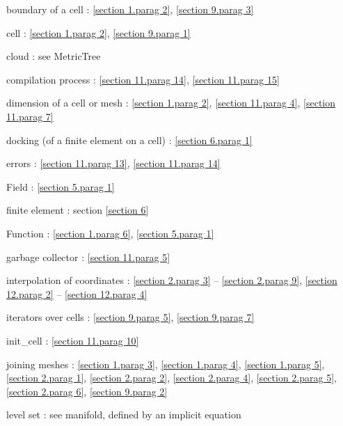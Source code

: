 \documentclass[a4paper]{scrreprt}
\def\numb{}
\newcommand\verm[1]{\textcolor{manif}{#1}}
\renewcommand\tt{\normalfont\ttfamily}
\begin{document}


\noindent
boundary of a cell : \ref{\numb section 1.\numb parag 2}, \ref{\numb section 9.\numb parag 3}

\noindent
cell : \ref{\numb section 1.\numb parag 2}, \ref{\numb section 9.\numb parag 1}

\noindent
cloud : see {\small\tt \verm{MetricTree}}

\noindent
compilation process : \ref{\numb section 11.\numb parag 14},
\ref{\numb section 11.\numb parag 15}

\noindent
dimension of a cell or mesh : \ref{\numb section 1.\numb parag 2},
\ref{\numb section 11.\numb parag 4}, \ref{\numb section 11.\numb parag 7}

\noindent
docking (of a finite element on a cell) : \ref{\numb section 6.\numb parag 1}

\noindent
errors : \ref{\numb section 11.\numb parag 13}, \ref{\numb section 11.\numb parag 14}

\noindent
{\small\tt \verm{Field}} : \ref{\numb section 5.\numb parag 1}

\noindent
finite element : section \ref{\numb section 6}

\noindent
{\small\tt \verm{Function}} : \ref{\numb section 1.\numb parag 6},
\ref{\numb section 5.\numb parag 1}

\noindent
garbage collector : \ref{\numb section 11.\numb parag 5}

\noindent
interpolation of coordinates :
\ref{\numb section 2.\numb parag 3} -- \ref{\numb section 2.\numb parag 9},
\ref{\numb section 12.\numb parag 2} -- \ref{\numb section 12.\numb parag 4}

\noindent
iterators over cells : \ref{\numb section 9.\numb parag 5}, \ref{\numb section 9.\numb parag 7}

\noindent
{\small\tt init\_cell} : \ref{\numb section 11.\numb parag 10}

\noindent
{\small\tt join}ing meshes : \ref{\numb section 1.\numb parag 3},
\ref{\numb section 1.\numb parag 4}, \ref{\numb section 1.\numb parag 5},
\ref{\numb section 2.\numb parag 1}, \ref{\numb section 2.\numb parag 2},
\ref{\numb section 2.\numb parag 4}, \ref{\numb section 2.\numb parag 5},
\ref{\numb section 2.\numb parag 6}, \ref{\numb section 9.\numb parag 2}

\noindent
level set : see manifold, defined by an implicit equation
\end{document}
